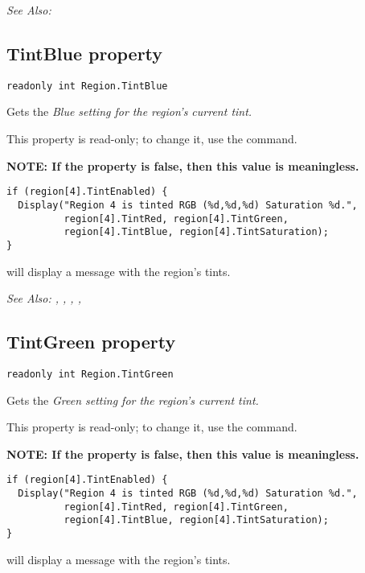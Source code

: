 \it{See Also:} 


\subsection{TintBlue property}\label{Region.TintBlue}%

\begin{verbatim}
readonly int Region.TintBlue
\end{verbatim}
Gets the \it{Blue} setting for the region's current tint.

This property is read-only; to change it, use the  command.

\bf{NOTE:} If the  property is false, then
this value is meaningless.

\begin{verbatim}
if (region[4].TintEnabled) {
  Display("Region 4 is tinted RGB (%d,%d,%d) Saturation %d.",
          region[4].TintRed, region[4].TintGreen,
          region[4].TintBlue, region[4].TintSaturation);
}
\end{verbatim}
will display a message with the region's tints.

\it{See Also:} , ,
, ,


\subsection{TintGreen property}\label{Region.TintGreen}%

\begin{verbatim}
readonly int Region.TintGreen
\end{verbatim}
Gets the \it{Green} setting for the region's current tint.

This property is read-only; to change it, use the  command.

\bf{NOTE:} If the  property is false, then
this value is meaningless.

\begin{verbatim}
if (region[4].TintEnabled) {
  Display("Region 4 is tinted RGB (%d,%d,%d) Saturation %d.",
          region[4].TintRed, region[4].TintGreen,
          region[4].TintBlue, region[4].TintSaturation);
}
\end{verbatim}
will display a message with the region's tints.

